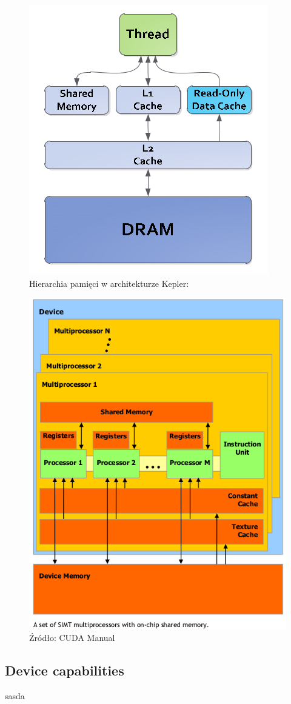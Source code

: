 \begin{figure}[ht]
\centering
\includegraphics[scale=0.4]{images/memory-hierarchy2.png}
\caption{Hierarchia pamięci w architekturze Kepler: \cite{kepler}}
\label{hierarchiaKepler}
\end{figure}

\begin{figure}[ht]
\centering
\includegraphics[scale=0.8]{images/gpu.png}
\caption{Źródło: CUDA Manual}
\end{figure}

\subsection{Device capabilities}
sasda
